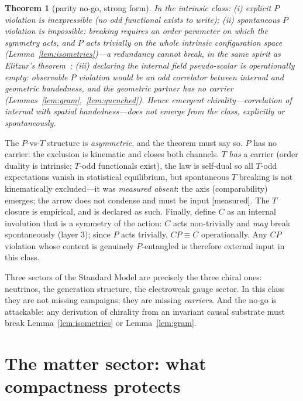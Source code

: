 \documentclass[aps,prd,reprint,nofootinbib,superscriptaddress,floatfix]{revtex4-2}
\newtheorem{theorem}{Theorem}
\theoremstyle{definition}
\begin{document}
\begin{theorem}[parity no-go, strong form]
\label{thm:parity}
In the intrinsic class: (i) explicit $P$ violation is \emph{inexpressible} (no odd
functional exists to write); (ii) spontaneous $P$ violation is \emph{impossible}:
breaking requires an order parameter on which the symmetry acts, and $P$ acts trivially
on the whole intrinsic configuration space (Lemma~\ref{lem:isometries})---a redundancy
cannot break, in the same spirit as Elitzur's theorem~\cite{Elitzur1975}; (iii) declaring
the internal field pseudo-scalar is operationally empty: observable $P$ violation would
be an odd correlator between internal and \emph{geometric} handedness, and the geometric
partner has no carrier (Lemmas~\ref{lem:gram},~\ref{lem:quenched}). Hence emergent
chirality---correlation of internal with spatial handedness---does not emerge from the
class, explicitly or spontaneously.
\end{theorem}

The $P$-vs-$T$ structure is \emph{asymmetric}, and the theorem must say so. $P$ has no
carrier: the exclusion is kinematic and closes both channels. $T$ \emph{has} a carrier
(order duality is intrinsic; $T$-odd functionals exist), the law is self-dual so all
$T$-odd expectations vanish in statistical equilibrium, but spontaneous $T$ breaking is
not kinematically excluded---it was \emph{measured absent}: the axis (comparability)
emerges; the arrow does not condense and must be input [measured]. The $T$ closure is
empirical, and is declared as such. Finally, define $C$ as an internal involution that
is a symmetry of the action: $C$ acts non-trivially and \emph{may} break spontaneously
(layer 3); since $P$ acts trivially, $CP\equiv C$ operationally. Any $CP$ violation
whose content is genuinely $P$-entangled is therefore external input in this class.

Three sectors of the Standard Model are precisely the three chiral ones: neutrinos,
the generation structure, the electroweak gauge sector. In this class they are not
missing campaigns; they are missing \emph{carriers}. And the no-go is attackable:
any derivation of chirality from an invariant causal substrate must break
Lemma~\ref{lem:isometries} or Lemma~\ref{lem:gram}.

\section{The matter sector: what compactness protects}
\label{sec:matter}
\end{document}
